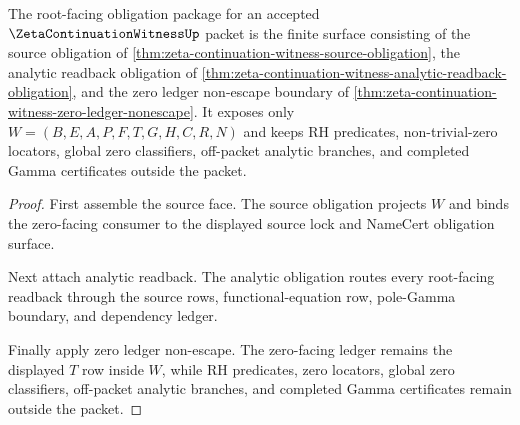 \begin{theorem}
\label{thm:zeta-continuation-witness-root-package}
The root-facing obligation package for an accepted $\ZetaContinuationWitnessUp$ packet is the finite surface consisting of the source obligation of \autoref{thm:zeta-continuation-witness-source-obligation}, the analytic readback obligation of \autoref{thm:zeta-continuation-witness-analytic-readback-obligation}, and the zero ledger non-escape boundary of \autoref{thm:zeta-continuation-witness-zero-ledger-nonescape}. It exposes only $W=(B,E,A,P,F,T,G,H,C,R,N)$ and keeps RH predicates, non-trivial-zero locators, global zero classifiers, off-packet analytic branches, and completed Gamma certificates outside the packet.
\end{theorem}
\begin{proof}
First assemble the source face. The source obligation projects $W$ and binds the zero-facing consumer to the displayed source lock and NameCert obligation surface.

Next attach analytic readback. The analytic obligation routes every root-facing readback through the source rows, functional-equation row, pole-Gamma boundary, and dependency ledger.

Finally apply zero ledger non-escape. The zero-facing ledger remains the displayed $T$ row inside $W$, while RH predicates, zero locators, global zero classifiers, off-packet analytic branches, and completed Gamma certificates remain outside the packet.
\end{proof}

